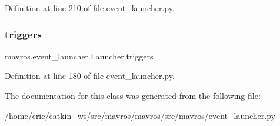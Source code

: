Definition at line 210 of file event\+\_\+launcher.\+py.

\mbox{\label{classmavros_1_1event__launcher_1_1Launcher_ab640f0f79a6eb6382f408131b8d36256}} 
\subsubsection{\texorpdfstring{triggers}{triggers}}
{\footnotesize\ttfamily mavros.\+event\+\_\+launcher.\+Launcher.\+triggers}



Definition at line 180 of file event\+\_\+launcher.\+py.



The documentation for this class was generated from the following file\+:\begin{DoxyCompactItemize}
\item 
/home/eric/catkin\+\_\+ws/src/mavros/mavros/src/mavros/\mbox{\hyperlink{event__launcher_8py}{event\+\_\+launcher.\+py}}\end{DoxyCompactItemize}
